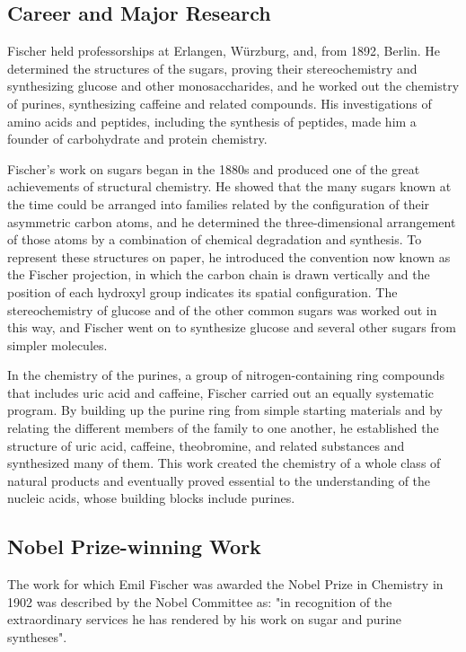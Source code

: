 \subsection*{Career and Major Research}

Fischer held professorships at Erlangen, Würzburg, and, from 1892, Berlin. He determined the structures of the sugars, proving their stereochemistry and synthesizing glucose and other monosaccharides, and he worked out the chemistry of purines, synthesizing caffeine and related compounds. His investigations of amino acids and peptides, including the synthesis of peptides, made him a founder of carbohydrate and protein chemistry.

Fischer's work on sugars began in the 1880s and produced one of the great achievements of structural chemistry. He showed that the many sugars known at the time could be arranged into families related by the configuration of their asymmetric carbon atoms, and he determined the three-dimensional arrangement of those atoms by a combination of chemical degradation and synthesis. To represent these structures on paper, he introduced the convention now known as the Fischer projection, in which the carbon chain is drawn vertically and the position of each hydroxyl group indicates its spatial configuration. The stereochemistry of glucose and of the other common sugars was worked out in this way, and Fischer went on to synthesize glucose and several other sugars from simpler molecules.

In the chemistry of the purines, a group of nitrogen-containing ring compounds that includes uric acid and caffeine, Fischer carried out an equally systematic program. By building up the purine ring from simple starting materials and by relating the different members of the family to one another, he established the structure of uric acid, caffeine, theobromine, and related substances and synthesized many of them. This work created the chemistry of a whole class of natural products and eventually proved essential to the understanding of the nucleic acids, whose building blocks include purines.

\subsection*{Nobel Prize-winning Work}

The work for which Emil Fischer was awarded the Nobel Prize in Chemistry in 1902 was described by the Nobel Committee as: "in recognition of the extraordinary services he has rendered by his work on sugar and purine syntheses".

